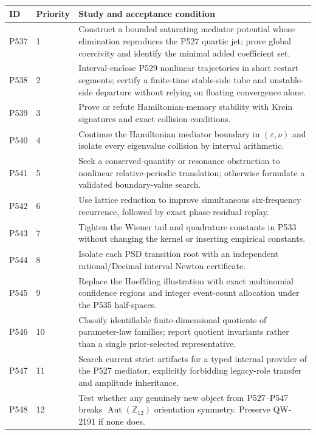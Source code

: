 \documentclass[11pt,a4paper]{article}
\begin{document}
\begin{longtable}{@{}p{}p{}p{}@{}}
\toprule
ID & Priority & Study and acceptance condition\\
\midrule
P537 & 1 & Construct a bounded saturating mediator potential whose elimination reproduces the P527 quartic jet; prove global coercivity and identify the minimal added coefficient set.\\
P538 & 2 & Interval-enclose P529 nonlinear trajectories in short restart segments; certify a finite-time stable-side tube and unstable-side departure without relying on floating convergence alone.\\
P539 & 3 & Prove or refute Hamiltonian-memory stability with Krein signatures and exact collision conditions.\\
P540 & 4 & Continue the Hamiltonian mediator boundary in $(\varepsilon,\nu)$ and isolate every eigenvalue collision by interval arithmetic.\\
P541 & 5 & Seek a conserved-quantity or resonance obstruction to nonlinear relative-periodic translation; otherwise formulate a validated boundary-value search.\\
P542 & 6 & Use lattice reduction to improve simultaneous six-frequency recurrence, followed by exact phase-residual replay.\\
P543 & 7 & Tighten the Wiener tail and quadrature constants in P533 without changing the kernel or inserting empirical constants.\\
P544 & 8 & Isolate each PSD transition root with an independent rational/Decimal interval Newton certificate.\\
P545 & 9 & Replace the Hoeffding illustration with exact multinomial confidence regions and integer event-count allocation under the P535 half-spaces.\\
P546 & 10 & Classify identifiable finite-dimensional quotients of parameter-law families; report quotient invariants rather than a single prior-selected representative.\\
P547 & 11 & Search current strict artifacts for a typed internal provider of the P527 mediator, explicitly forbidding legacy-role transfer and amplitude inheritance.\\
P548 & 12 & Test whether any genuinely new object from P527--P547 breaks $\operatorname{Aut}(\mathbb Z_{12})$ orientation symmetry. Preserve QW-2191 if none does.\\
\bottomrule
\end{longtable}
\end{document}
